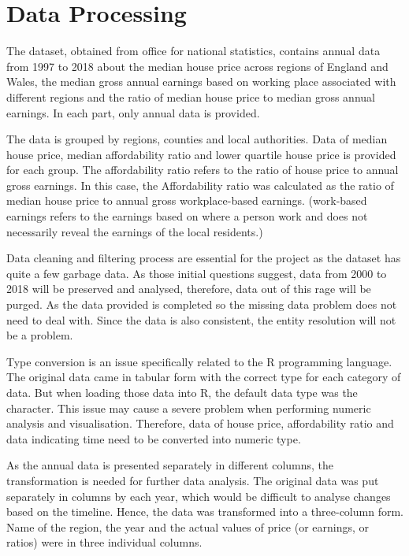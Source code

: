 \documentclass{article}
\begin{document}



\section{Data Processing}

The dataset, obtained from office for national statistics, contains annual data from 1997 to 2018 about the median house price across regions of England and Wales, the median gross annual earnings based on working place associated with different regions and the ratio of median house price to median gross annual earnings.\cite{henretty_2019} \cite{henretty_data_2019}
In each part, only annual data is provided. 

The data is grouped by regions, counties and local authorities. Data of median house price, median affordability ratio and lower quartile house price is provided for each group. The affordability ratio refers to the ratio of house price to annual gross earnings. In this case, the Affordability ratio was calculated as the ratio of median house price to annual gross workplace-based earnings. 
(work-based earnings refers to the earnings based on where a person work and does not necessarily reveal 
the earnings of the local residents.)

Data cleaning and filtering process are essential for the project as the dataset has quite a few garbage data. 
As those initial questions suggest, data from 2000 to 2018 will be preserved and analysed, therefore, data out of this rage will be purged. As the data provided is completed so the missing data problem does not need to deal with. Since the data is also consistent, the entity resolution will not be a problem. 

Type conversion is an issue specifically related to the R programming language. The original data came in tabular form with the correct type for each category of data. But when loading those data into R, the default data type was the character. This issue may cause a severe problem when performing numeric analysis and visualisation. 
Therefore, data of house price, affordability ratio and data indicating time need to be converted into numeric type. 

As the annual data is presented separately in different columns, the transformation is needed for further data analysis. The original data was put separately in columns by each year, which would be difficult to analyse changes based on the timeline. Hence, the data was transformed into a three-column form. Name of the region, 
the year and the actual values of price (or earnings, or ratios) were in three individual columns.
\end{document}
